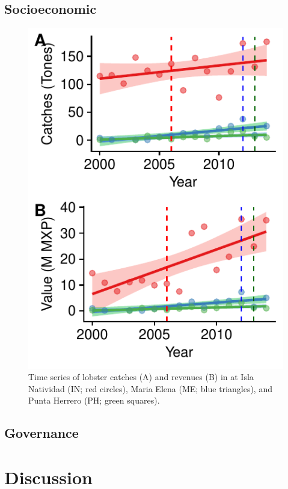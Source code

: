 \documentclass{frontiersSCNS}
\theoremstyle{definition}
\theoremstyle{definition}
\theoremstyle{definition}
\theoremstyle{remark}
\begin{document}
\subsection{Socioeconomic}\label{socioeconomic}

\begin{figure}
\centering
\includegraphics{Villasenor-Derbez_files/figure-latex/unnamed-chunk-5-1.pdf}
\caption{\label{fig:unnamed-chunk-5}\label{fig:lobsters}Time series of
lobster catches (A) and revenues (B) in at Isla Natividad (IN; red
circles), Maria Elena (ME; blue triangles), and Punta Herrero (PH; green
squares).}
\end{figure}

\subsection{Governance}\label{governance-1}

\section{Discussion}\label{discussion}
\end{document}
